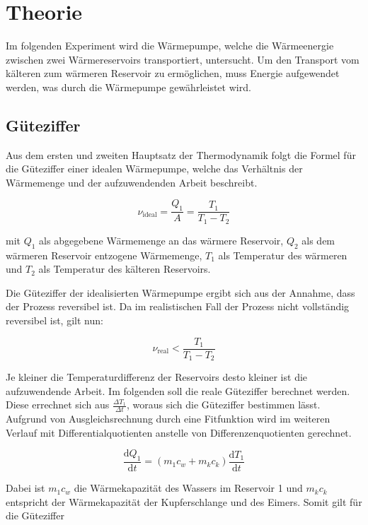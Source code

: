 \section{Theorie}
\label{sec:Theorie}

Im folgenden Experiment wird die Wärmepumpe, welche die Wärmeenergie zwischen zwei Wärmereservoirs transportiert, untersucht. Um den Transport vom kälteren zum wärmeren Reservoir zu ermöglichen, muss Energie aufgewendet werden, was durch die Wärmepumpe gewährleistet wird.

\subsection{Güteziffer}
Aus dem ersten und zweiten Hauptsatz der Thermodynamik folgt die Formel für die Güteziffer einer idealen Wärmepumpe, welche das Verhältnis der Wärmemenge und der aufzuwendenden Arbeit beschreibt.

\begin{equation}
ν_{\mathrm{ideal}} = \frac{Q_{1}}{A} = \frac{T_{1}}{T_{1}-T_{2}}
\end{equation}

mit $Q_{1}$ als abgegebene Wärmemenge an das wärmere Reservoir, $Q_{2}$ als dem wärmeren Reservoir entzogene Wärmemenge, $T_{1}$ als Temperatur des wärmeren und $T_{2}$ als Temperatur des kälteren Reservoirs.

Die Güteziffer der idealisierten Wärmepumpe ergibt sich aus der Annahme, dass der Prozess reversibel ist. Da im realistischen Fall der Prozess nicht vollständig reversibel ist, gilt nun:

\begin{equation}
ν_{\mathrm{real}} < \frac{T_{1}}{T_{1} - T_{2}}
\end{equation}

Je kleiner die Temperaturdifferenz der Reservoirs desto kleiner ist die aufzuwendende Arbeit.
Im folgenden soll die reale Güteziffer berechnet werden. Diese errechnet sich aus $\frac{\Delta T_{1}}{\Delta t}$, woraus sich die Güteziffer bestimmen lässt.
Aufgrund von Ausgleichsrechnung durch eine Fitfunktion wird im weiteren Verlauf mit Differentialquotienten anstelle von Differenzenquotienten gerechnet.

\begin{equation}
\frac{\mathrm{d}Q_{1}}{\mathrm{d}t} = (m_{1} c_w + m_k c_k)\frac {\mathrm{d}T_{1}}{\mathrm{d}t}
\end{equation}

Dabei ist $m_{1} c_w$ die Wärmekapazität des Wassers im Reservoir 1 und $m_k c_k$ entspricht der Wärmekapazität der Kupferschlange und des Eimers. Somit gilt für die Güteziffer

